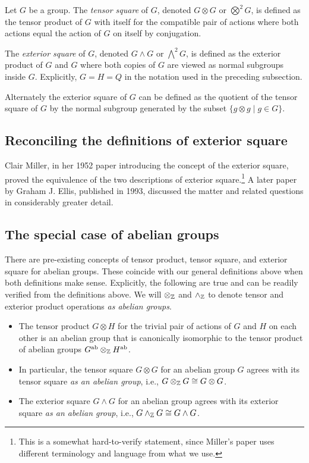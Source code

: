 Let $G$ be a group. The {\em tensor square} of $G$, denoted $G \otimes
G$ or $\bigotimes^2G$, is defined as the tensor product of $G$ with
itself for the compatible pair of actions where both actions equal the
action of $G$ on itself by conjugation.

The {\em exterior square} of $G$, denoted $G \wedge G$ or
$\bigwedge^2G$, is defined as the exterior product of $G$ and $G$
where both copies of $G$ are viewed as normal subgroups inside
$G$. Explicitly, $G = H = Q$ in the notation used in the preceding
subsection.

Alternately the exterior square of $G$ can be defined as the quotient
of the tensor square of $G$ by the normal subgroup generated by the
subset $\{ g \otimes g \mid g \in G \}$.

\subsection{Reconciling the definitions of exterior square}\label{sec:exteriorsquare-reconciliation}

Clair Miller, in her 1952 paper \cite{Miller52} introducing the
concept of the exterior square, proved the equivalence of the two
descriptions of exterior square.\footnote{This is a somewhat
  hard-to-verify statement, since Miller's paper uses different
  terminology and language from what we use.} A later paper
\cite{Ellis93} by Graham J. Ellis, published in 1993, discussed the
matter and related questions in considerably greater detail.

\subsection{The special case of abelian groups}\label{sec:exterior-tensor-abelian-reconciliation}

There are pre-existing concepts of tensor product, tensor square, and
exterior square for abelian groups. These coincide with our general
definitions above when both definitions make sense. Explicitly, the
following are true and can be readily verified from the definitions
above. We will $\otimes_{\mathbb{Z}}$ and $\wedge_{\mathbb{Z}}$ to denote tensor and
exterior product operations {\em as abelian groups}.

\begin{itemize}
\item The tensor product $G \otimes H$ for the trivial pair of actions
  of $G$ and $H$ on each other is an abelian group that is canonically
  isomorphic to the tensor product of abelian groups
  $G^{\operatorname{ab}} \otimes_{\mathbb{Z}} H^{\operatorname{ab}}$.
\item In particular, the tensor square $G \otimes G$ for an abelian
  group $G$ agrees with its tensor square {\em as an abelian group},
  i.e., $G \otimes_{\mathbb{Z}} G \cong G \otimes G$.
\item The exterior square $G \wedge G$ for an abelian group agrees
  with its exterior square {\em as an abelian group}, i.e., $G
  \wedge_{\mathbb{Z}} G \cong G \wedge G$.
\end{itemize}

